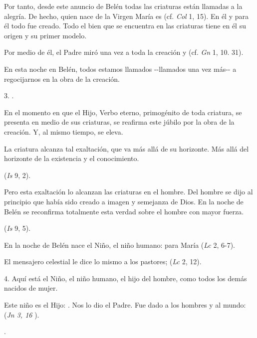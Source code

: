 \begin{body}
\begin{body}
		Por tanto, desde este anuncio de Belén todas las criaturas están llamadas a la alegría. De hecho, quien nace de la Virgen María es  (cf. \emph{Col} 1, 15). En él y para él todo fue creado. Todo el bien que se encuentra en las criaturas tiene en él su origen y su primer modelo.
		
		Por medio de él, el Padre miró una vez a toda la creación y  (cf. \emph{Gn} 1, 10. 31).
		
		En esta noche en Belén, todos estamos llamados -\/-llamados una vez más-\/- a regocijarnos en la obra de la creación.
		
		3. .
		
		En el momento en que el Hijo, Verbo eterno, primogénito de toda criatura, se presenta en medio de sus criaturas, se reafirma este júbilo por la obra de la creación. Y, al mismo tiempo, se eleva.
		
		La criatura alcanza tal exaltación, que va más allá de su horizonte. Más allá del horizonte de la existencia y el conocimiento.
		
		 (\emph{Is} 9, 2).
		
		Pero esta exaltación lo alcanzan las criaturas en el hombre. Del hombre se dijo al principio que había sido creado a imagen y semejanza de Dios. En la noche de Belén se reconfirma totalmente esta verdad sobre el hombre con mayor fuerza.
		
		 (\emph{Is} 9, 5).
		
		En la noche de Belén nace el Niño, el niño humano: para María  (\emph{Lc} 2, 6-7).
		
		El mensajero celestial le dice lo mismo a los pastores;  (\emph{Lc} 2, 12).
		
		4. Aquí está el Niño, el niño humano, el hijo del hombre, como todos los demás nacidos de mujer.
		
		Este niño es el Hijo: . Nos lo dio el Padre. Fue dado a los hombres y al mundo:  (\emph{Jn 3, 16} ).
		
		.
		

\end{body}
\end{body}
